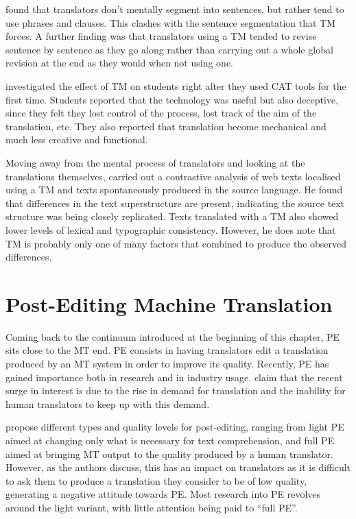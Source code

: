 \textcite{dragsted2004segmentation,dragsted2006computer} found that translators don't mentally segment into sentences, but rather tend to use phrases and clauses. This clashes with the sentence segmentation that \ac{TM} forces. A further finding was that translators using a \ac{TM} tended to revise sentence by sentence as they go along rather than carrying out a whole global revision at the end as they would when not using one. 

\textcite{christensen2011impact} investigated the effect of \ac{TM} on students right after they used \ac{CAT} tools for the first time. Students reported that the technology was useful but also deceptive, since they felt they lost control of the process, lost track of the aim of the translation, etc. They also reported that translation become mechanical and much less creative and functional. 

Moving away from the mental process of translators and looking at the translations themselves, \textcite{jimenez2010effect} carried out a contrastive analysis of web texts localised using a \ac{TM} and texts spontaneously produced in the source language. He found that differences in the text superstructure are present, indicating the source text structure was being closely replicated. Texts translated with a \ac{TM} also showed lower levels of lexical and typographic consistency. However, he does note that \ac{TM} is probably only one of many factors that combined to produce the observed differences.


\section{Post-Editing Machine Translation}

\noindent Coming back to the continuum introduced at the beginning of this chapter, \acf{PE} sits close to the \ac{MT} end. \acl{PE} consists in having translators edit a translation produced by an \ac{MT} system in order to improve its quality. Recently, \ac{PE} has gained importance both in research and in industry usage. \textcite{carl2015post} claim that the recent surge in interest is due to the rise in demand for translation and the inability for human translators to keep up with this demand.

\textcite{carl2015post} propose different types and quality levels for post-editing, ranging from light \ac{PE} aimed at changing only what is necessary for text comprehension, and full \ac{PE} aimed at bringing \ac{MT} output to the quality produced by a human translator. However, as the authors discuss, this has an impact on translators as it is difficult to ask them to produce a translation they consider to be of low quality, generating a negative attitude towards \ac{PE}. Most research into \ac{PE} revolves around the light variant, with little attention being paid to ``full \ac{PE}''. 


